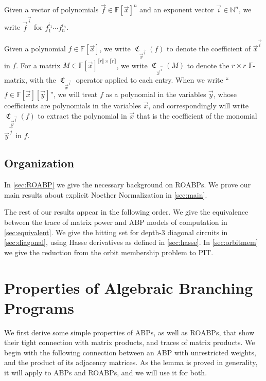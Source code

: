 \documentclass[letterpaper,11pt]{article}
\numberwithin{equation}{section}
\theoremstyle{plain}
\theoremstyle{remark}
\newcommand{\zr}[1]{{\llbracket {#1}\rrbracket}}
\DeclareMathOperator{\coeffo}{\mathfrak{C}}
\newcommand{\coeff}[1]{\coeffo_{#1}}
\newcommand{\F}{\mathbb{F}}
\newcommand{\N}{\mathbb{N}}
\begin{document}
Given a vector of polynomials $\vec{f}\in \F[\vec{x}]^n$ and an exponent vector $\vec{i}\in\N^n$, we write $\vec{f}^{\vec{i}}$  for $f_1^{i_1}\cdots f_n^{i_n}$.

Given a polynomial $f\in\F[\vec{x}]$, we write $\coeff{\vec{x}^{\vec{i}}}(f)$ to denote the coefficient of $\vec{x}^{\vec{i}}$ in $f$.  For a matrix $M\in\F[\vec{x}]^{\zr{r}\times \zr{r}}$, we write $\coeff{\vec{x}^{\vec{i}}}(M)$ to denote the $r\times r$ $\F$-matrix, with the $\coeff{\vec{x}^{\vec{i}}}$ operator applied to each entry. When we write ``$f\in\F[\vec{x}][\vec{y}]$'', we will treat $f$ as a polynomial in the variables $\vec{y}$, whose coefficients are polynomials in the variables $\vec{x}$, and correspondingly will write $\coeff{\vec{y}^{\vec{j}}}(f)$ to extract the polynomial in $\vec{x}$ that is the coefficient of the monomial $\vec{y}^{\vec{j}}$ in $f$.

\subsection{Organization}

In \autoref{sec:ROABP} we give the necessary background on ROABPs. We prove our main results about explicit Noether Normalization in \autoref{sec:main}. 

The rest of our results appear in the following order.  We give the equivalence between the trace of matrix power and ABP models of computation in \autoref{sec:equivalent}.  We give the hitting set for depth-3 diagonal circuits in \autoref{sec:diagonal}, using Hasse derivatives as defined in \autoref{sec:hasse}.  In \autoref{sec:orbitmem} we give the reduction from the orbit membership problem to PIT.


\section{Properties of Algebraic Branching Programs}\label{sec:ROABP}

We first derive some simple properties of ABPs, as well as ROABPs, that show their tight connection with matrix products, and traces of matrix products.  We begin with the following connection between an ABP with unrestricted weights, and the product of its adjacency matrices.  As the lemma is proved in generality, it will apply to ABPs and ROABPs, and we will use it for both.
\end{document}
